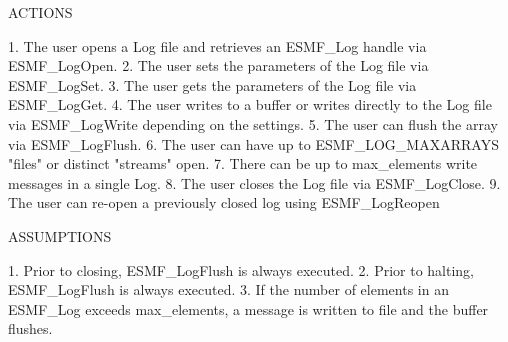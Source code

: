 

ACTIONS

1. The user opens a Log file and retrieves an  ESMF_Log handle via ESMF_LogOpen.
2. The user sets the parameters of the Log file via ESMF_LogSet.
3. The user gets the parameters of the Log file via ESMF_LogGet.
4. The user writes to a buffer or writes directly to the Log file via ESMF_LogWrite depending on the settings.
5. The user can flush the array via ESMF_LogFlush.
6. The user can have up to ESMF_LOG_MAXARRAYS "files" or distinct "streams" open.
7. There can be up to max_elements write messages in a single Log.
8. The user closes the Log file via ESMF_LogClose.
9. The user can re-open a previously closed log using ESMF_LogReopen

ASSUMPTIONS

1. Prior to closing, ESMF_LogFlush is always executed.
2. Prior to halting, ESMF_LogFlush is always executed.
3. If the number of elements in an ESMF_Log exceeds max_elements, a message is written to file and the buffer flushes.

